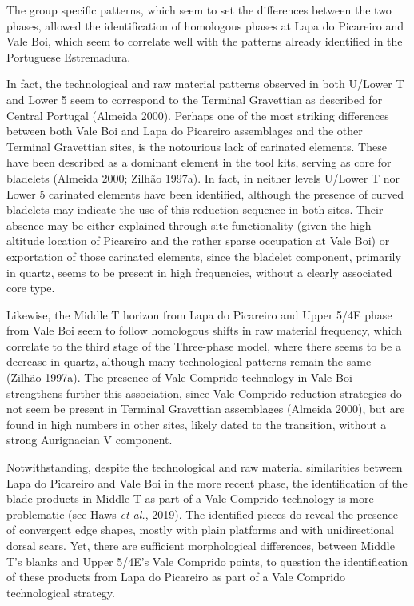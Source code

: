 \documentclass[12pt,twoside]{reedthesis}
\begin{document}
The group specific patterns, which seem to set the differences between the two phases, allowed the identification of homologous phases at Lapa do Picareiro and Vale Boi, which seem to correlate well with the patterns already identified in the Portuguese Estremadura.

In fact, the technological and raw material patterns observed in both U/Lower T and Lower 5 seem to correspond to the Terminal Gravettian as described for Central Portugal (Almeida 2000). Perhaps one of the most striking differences between both Vale Boi and Lapa do Picareiro assemblages and the other Terminal Gravettian sites, is the notourious lack of carinated elements. These have been described as a dominant element in the tool kits, serving as core for bladelets (Almeida 2000; Zilhão 1997a). In fact, in neither levels U/Lower T nor Lower 5 carinated elements have been identified, although the presence of curved bladelets may indicate the use of this reduction sequence in both sites. Their absence may be either explained through site functionality (given the high altitude location of Picareiro and the rather sparse occupation at Vale Boi) or exportation of those carinated elements, since the bladelet component, primarily in quartz, seems to be present in high frequencies, without a clearly associated core type.

Likewise, the Middle T horizon from Lapa do Picareiro and Upper 5/4E phase from Vale Boi seem to follow homologous shifts in raw material frequency, which correlate to the third stage of the Three-phase model, where there seems to be a decrease in quartz, although many technological patterns remain the same (Zilhão 1997a). The presence of Vale Comprido technology in Vale Boi strengthens further this association, since Vale Comprido reduction strategies do not seem be present in Terminal Gravettian assemblages (Almeida 2000), but are found in high numbers in other sites, likely dated to the transition, without a strong Aurignacian V component.

Notwithstanding, despite the technological and raw material similarities between Lapa do Picareiro and Vale Boi in the more recent phase, the identification of the blade products in Middle T as part of a Vale Comprido technology is more problematic (see Haws \emph{et al.}, 2019). The identified pieces do reveal the presence of convergent edge shapes, mostly with plain platforms and with unidirectional dorsal scars. Yet, there are sufficient morphological differences, between Middle T's blanks and Upper 5/4E's Vale Comprido points, to question the identification of these products from Lapa do Picareiro as part of a Vale Comprido technological strategy.
\end{document}
